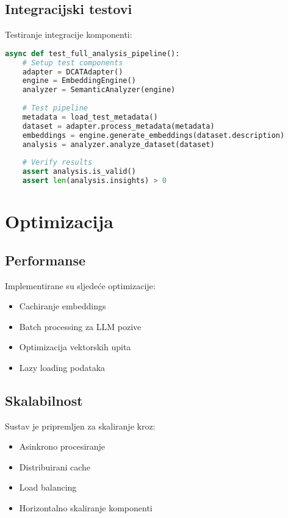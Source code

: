 \subsection{Integracijski testovi}
Testiranje integracije komponenti:

\begin{lstlisting}[language=Python, caption=Primjer integracijskog testa]
async def test_full_analysis_pipeline():
    # Setup test components
    adapter = DCATAdapter()
    engine = EmbeddingEngine()
    analyzer = SemanticAnalyzer(engine)
    
    # Test pipeline
    metadata = load_test_metadata()
    dataset = adapter.process_metadata(metadata)
    embeddings = engine.generate_embeddings(dataset.description)
    analysis = analyzer.analyze_dataset(dataset)
    
    # Verify results
    assert analysis.is_valid()
    assert len(analysis.insights) > 0
\end{lstlisting}

\section{Optimizacija}
\label{sec:optimization}

\subsection{Performanse}
Implementirane su sljedeće optimizacije:
\begin{itemize}
    \item Cachiranje embeddings
    \item Batch processing za LLM pozive
    \item Optimizacija vektorskih upita
    \item Lazy loading podataka
\end{itemize}

\subsection{Skalabilnost}
Sustav je pripremljen za skaliranje kroz:
\begin{itemize}
    \item Asinkrono procesiranje
    \item Distribuirani cache
    \item Load balancing
    \item Horizontalno skaliranje komponenti
\end{itemize} 